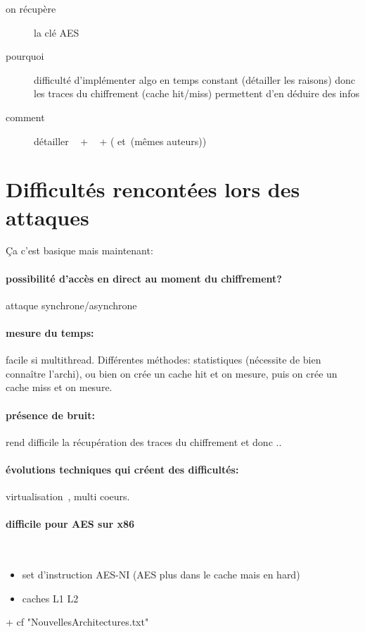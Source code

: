 \documentclass[a4paper,11pt]{article}
\begin{document}
 

\begin{description}
\item[on récupère] la clé AES
\item[pourquoi] difficulté d'implémenter algo en temps constant (détailler les raisons) donc les traces du chiffrement (cache hit/miss) permettent d'en déduire des infos
\item[comment] détailler  ~\cite{canteaut2006understanding} + ~\cite{bernstein2005cache} + (\cite{tromer2010efficient} et~\cite{osvik2006cache}(mêmes auteurs))
\end{description}

\section{Difficultés rencontées lors des attaques} %
Ça c'est basique mais maintenant:

\paragraph{possibilité d'accès en direct au moment du chiffrement?} attaque synchrone/asynchrone~\cite{osvik2006cache} %
\paragraph{mesure du temps:} facile si multithread. Différentes méthodes: statistiques (nécessite de bien connaître l'archi), ou bien on crée un cache hit et on mesure, puis on crée un cache miss et on mesure. %
\paragraph{présence de bruit:} rend difficile la récupération des traces du chiffrement et donc .. %
\paragraph{évolutions techniques qui créent des difficultés:} virtualisation~\cite{weiss2012cache}, multi coeurs.  %
\paragraph{difficile pour AES sur x86}~\cite{mowery2012aes}  %
\begin{itemize}
\item set d'instruction AES-NI (AES plus dans le cache mais en hard)
\item caches L1 L2
\end{itemize}
+ cf "NouvellesArchitectures.txt"
\end{document}
